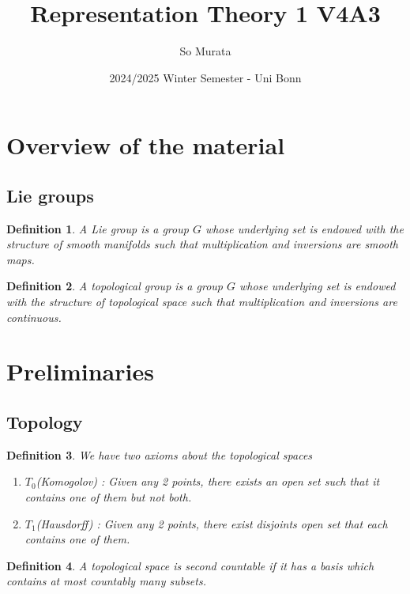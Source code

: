 \documentclass{article}
\title{Representation Theory 1 V4A3}
\author{So Murata}
\date{2024/2025 Winter Semester - Uni Bonn}
\newtheorem{definition}{Definition}[section]
\numberwithin{equation}{section}
\begin{document}
\maketitle

\section{Overview of the material}

\subsection{Lie groups}

\begin{definition}
A Lie group is a group $G$ whose underlying set is endowed with the structure of smooth manifolds such that multiplication and inversions are smooth maps.
\end{definition}

\begin{definition}
A topological group is a group $G$ whose underlying set is endowed with the structure of topological space such that multiplication and inversions are continuous.
\end{definition}

\section{Preliminaries}

\subsection{Topology}

\begin{definition}
We have two axioms about the topological spaces
\begin{enumerate}
\item $T_0$(Komogolov) : Given any 2 points, there exists an open set such that it contains one of them but not both.
\item $T_1$(Hausdorff) : Given any 2 points, there exist disjoints open set that each contains one of them.
\end{enumerate}
\end{definition}

\begin{definition}
A topological space is second countable if it has a basis which contains at most countably many subsets.
\end{definition}
\end{document}
